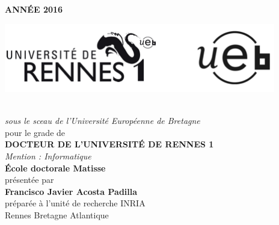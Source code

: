 {\selectfont
\thispagestyle{empty}
\begin{minipage}{\textwidth}
\vspace{-7cm}
\hfill
\textbf{ANN\'EE 2016}
\end{minipage}

\vspace{-3.5cm}\hspace{-2cm}
 	\center
\includegraphics[height=30mm]{Logos.png} 

\vspace{.7cm}
\begin{center}
\begin{minipage}{\textwidth}
\\ \vspace{0mm}\emph{\large sous le sceau de l'Universit\'e Europ\'eenne de Bretagne}\\
\vspace{0.5cm}
{\large pour le grade de}\\ \vspace{2mm}
{\Large\bfseries  DOCTEUR DE L'UNIVERSIT\'E DE RENNES 1}\\ \vspace{0.4cm}
\emph{\large Mention : Informatique}\\ \vspace{2mm}
{\Large\bfseries  \'Ecole doctorale Matisse}\\ \vspace{0.5cm}
{\large pr\'esent\'ee par} \\ \vspace{3mm}
{\Huge\bfseries Francisco Javier Acosta Padilla}\\ \vspace{0.6cm}
{\large pr\'epar\'ee \`a l'unit\'e de recherche INRIA\\}
{\large\vspace{0.00cm}Rennes Bretagne Atlantique\\}
\end{minipage}
\vspace{0.3cm}


\end{center}}
